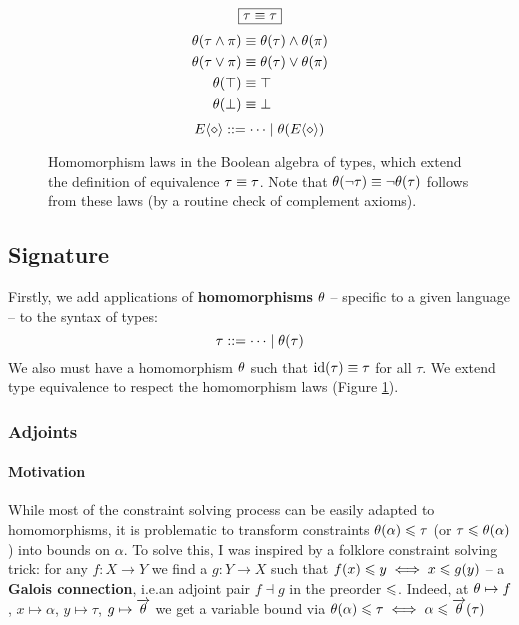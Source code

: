\begin{figure}
    \centering
    $$\boxed{\tau \equiv \tau}$$
    \vspace{-2.5em}
    \begin{align*}
        \theta(\tau \land \pi) &\equiv \theta(\tau) \land \theta(\pi) \\
        \theta(\tau \lor \pi) &\equiv \theta(\tau) \lor \theta(\pi) \\
        \theta(\top) &\equiv \top \\
        \theta(\bot) &\equiv \bot
    \end{align*}
    \vspace{-1.5em}
    $$ \equivctx ::= \cdots \mid \morph(\equivctx) $$
    \caption{Homomorphism laws in the Boolean algebra of types, which extend the definition of equivalence $\tau \equiv \tau$. Note that $\theta(\lnot \tau) \equiv \lnot \theta(\tau)$ follows from these laws (by a routine check of complement axioms).}
    \label{fig:morphism-laws}
\end{figure}

\subsection{Signature}
\label{subsec:signature-morphisms}

Firstly, we add applications of \textbf{homomorphisms} $\theta$ -- specific to a given language -- to the syntax of types:
$$ \tau ::= \cdots \mid \theta(\tau) $$
We also must have a homomorphism $\theta$ such that $\mathrm{id}(\tau) \equiv \tau$ for all $\tau$. We extend type equivalence to respect the homomorphism laws (Figure \ref{fig:morphism-laws}).

\subsubsection{Adjoints}

\paragraph{Motivation}
While most of the constraint solving process can be easily adapted to homomorphisms, it is problematic to transform constraints $\theta(\alpha) \leqslant \tau$ (or $\tau \leqslant \theta(\alpha)$) into bounds on $\alpha$. 
To solve this, I was inspired by a folklore constraint solving trick: for any $f : X \to Y$ we find a $g : Y \to X$ such that $f(x) \leqslant y \iff x \leqslant g(y)$ -- a \textbf{Galois connection}, i.e.\@ an adjoint pair $f \dashv g$ in the preorder $\leqslant$. Indeed, at $\theta \mapsto f$, $x \mapsto \alpha$, $y \mapsto \tau$, $g \mapsto \overrightarrow{\theta}$ we get a variable bound via $\theta(\alpha) \leqslant \tau \iff \alpha \leqslant \overrightarrow{\theta}(\tau)$

